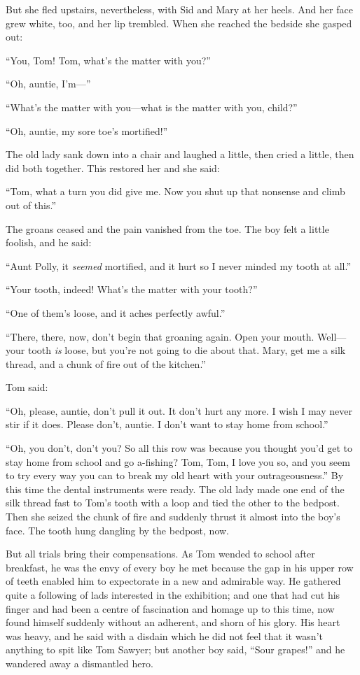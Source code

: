 \documentclass{book}
\begin{document}
But she fled upstairs, nevertheless, with Sid and Mary at her heels. And her face grew white, too, and her lip trembled. When she reached the bedside she gasped out:

“You, Tom! Tom, what’s the matter with you?”

“Oh, auntie, I’m—”

“What’s the matter with you—what is the matter with you, child?”

“Oh, auntie, my sore toe’s mortified!”

The old lady sank down into a chair and laughed a little, then cried a little, then did both together. This restored her and she said:

“Tom, what a turn you did give me. Now you shut up that nonsense and climb out of this.”

The groans ceased and the pain vanished from the toe. The boy felt a little foolish, and he said:

“Aunt Polly, it \emph{seemed} mortified, and it hurt so I never minded my tooth at all.”

“Your tooth, indeed! What’s the matter with your tooth?”

“One of them’s loose, and it aches perfectly awful.”

“There, there, now, don’t begin that groaning again. Open your mouth. Well—your tooth \emph{is} loose, but you’re not going to die about that. Mary, get me a silk thread, and a chunk of fire out of the kitchen.”

Tom said:

“Oh, please, auntie, don’t pull it out. It don’t hurt any more. I wish I may never stir if it does. Please don’t, auntie. I don’t want to stay home from school.”

“Oh, you don’t, don’t you? So all this row was because you thought you’d get to stay home from school and go a-fishing? Tom, Tom, I love you so, and you seem to try every way you can to break my old heart with your outrageousness.” By this time the dental instruments were ready. The old lady made one end of the silk thread fast to Tom’s tooth with a loop and tied the other to the bedpost. Then she seized the chunk of fire and suddenly thrust it almost into the boy’s face. The tooth hung dangling by the bedpost, now.

But all trials bring their compensations. As Tom wended to school after breakfast, he was the envy of every boy he met because the gap in his upper row of teeth enabled him to expectorate in a new and admirable way. He gathered quite a following of lads interested in the exhibition; and one that had cut his finger and had been a centre of fascination and homage up to this time, now found himself suddenly without an adherent, and shorn of his glory. His heart was heavy, and he said with a disdain which he did not feel that it wasn’t anything to spit like Tom Sawyer; but another boy said, “Sour grapes!” and he wandered away a dismantled hero.
\end{document}
